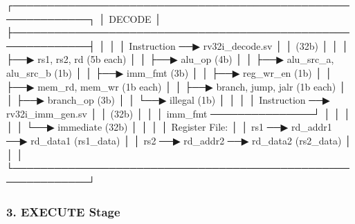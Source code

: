 \begin{record}

\begin{textblock}
┌─────────────────────────────────────────────────────────────┐
│                       DECODE                                │
├─────────────────────────────────────────────────────────────┤
│                                                             │
│  Instruction ──▶ rv32i_decode.sv                            │
│     (32b)                │                                  │
│                          ├──▶ rs1, rs2, rd (5b each)        │
│                          ├──▶ alu_op (4b)                   │
│                          ├──▶ alu_src_a, alu_src_b (1b)     │
│                          ├──▶ imm_fmt (3b)                  │
│                          ├──▶ reg_wr_en (1b)                │
│                          ├──▶ mem_rd, mem_wr (1b each)      │
│                          ├──▶ branch, jump, jalr (1b each)  │
│                          ├──▶ branch_op (3b)                │
│                          └──▶ illegal (1b)                  │
│                                                             │
│  Instruction ──▶ rv32i_imm_gen.sv                           │
│     (32b)                │                                  │
│  imm_fmt ───────────────┘                                   │
│                          │                                  │
│                          └──▶ immediate (32b)               │
│                                                             │
│  Register File:                                             │
│  rs1 ──▶ rd_addr1 ──▶ rd_data1 (rs1_data)                  │
│  rs2 ──▶ rd_addr2 ──▶ rd_data2 (rs2_data)                  │
│                                                             │
└─────────────────────────────────────────────────────────────┘
\end{textblock}

\end{record}

\subsubsection{3. EXECUTE Stage}\label{cr:fix:cpu-dataflow-diagram:3-execute-stage}

